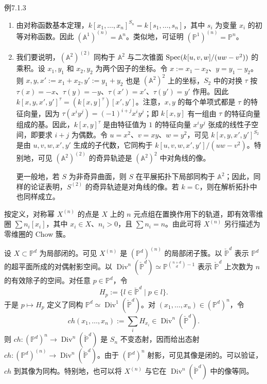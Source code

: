 \begin{origstatement}{例}{7.1.3}\label{ch07:7.1.3}
\begin{enumerate}[label=(\arabic*)]
\item 由对称函数基本定理，$k[x_1,\ldots,x_n]^{S_n}=k[s_1,\ldots,s_n]$，其中 $s_i$ 为变量 $x_i$ 的初等对称函数。因此 $(\mathbb A^1)^{(n)}=\mathbb A^n$。类似地，可证明 $(\mathbb P^1)^{(n)}=\mathbb P^n$。
\item 我们要说明，$(\mathbb A^2)^{(2)}$ 同构于 $\mathbb A^2$ 与二次锥面 $\operatorname{Spec}(k[u,v,w]/(uw-v^2))$ 的乘积。设 $x_1,y_1$ 和 $x_2,y_2$ 为两个因子的坐标。令 $x:=x_1-x_2$、$y=y_1-y_2$。则 $x,y,x':=x_1+x_2,y':=y_1+y_2$ 也是 $(\mathbb A^2)^2$ 上的坐标，$S_2$ 中的对换 $\tau$ 按 $\tau(x)=-x$、$\tau(y)=-y$、$\tau(x')=x'$、$\tau(y')=y'$ 作用。因此 $k[x,y,x',y']^\tau=(k[x,y]^\tau)[x',y']$。注意，$x,y$ 的每个单项式都是 $\tau$ 的特征向量，因为 $\tau(x^iy^j)=(-1)^{i+j}x^iy^j$；即 $k[x,y]$ 有一组由 $\tau$ 的特征向量组成的基。因此，$k[x,y]^\tau$ 是由特征值为 $1$ 的特征向量 $x^iy^j$ 张成的线性子空间，即要求 $i+j$ 为偶数。令 $u=x^2$、$v=xy$、$w=y^2$，可见 $k[x,y,x',y']^{S_2}$ 是由 $u,v,w,x',y'$ 生成的子代数，它同构于 $k[u,v,w,x',y']/(uw-v^2)$。特别地，可见 $(\mathbb A^2)^{(2)}$ 的奇异轨迹是 $(\mathbb A^2)^2$ 中对角线的像。

更一般地，若 $S$ 为非奇异曲面，则 $S$ 在平展拓扑下局部同构于 $\mathbb A^2$；因此，同样的论证表明，$S^{(2)}$ 的奇异轨迹是对角线的像。若 $k=\mathbb C$，则在解析拓扑中也同样成立。
\end{enumerate}
\end{origstatement}
按定义，对称幂 $X^{(n)}$ 的点是 $X$ 上的 $n$ 元点组在置换作用下的轨道，即有效零维圈 $\sum n_i[x_i]$，其中 $x_i\in X$、$n_i>0$，且 $\sum n_i=n$。由此可将 $X^{(n)}$ 另行描述为零维圈的 Chow 簇。

设 $X\subset\mathbb P^d$ 为局部闭的。可见 $X^{(n)}$ 是 $(\mathbb P^d)^{(n)}$ 的局部闭子簇。以 $\check{\mathbb P}^d$ 表示 $\mathbb P^d$ 的超平面所成的对偶射影空间。以 $\operatorname{Div}^n(\check{\mathbb P}^d)\simeq\mathbb P^{\binom{n+d}{d}-1}$ 表示 $\check{\mathbb P}^d$ 上次数为 $n$ 的有效除子的空间。对任意 $p\in\mathbb P^d$，令
\[
H_p:=\{l\in\check{\mathbb P}^d\mid p\in l\}.
\]
于是 $p\mapsto H_p$ 定义了同构 $\mathbb P^d\simeq\operatorname{Div}^1(\check{\mathbb P}^d)$。对 $(x_1,\ldots,x_n)\in(\mathbb P^d)^n$，令
\[
ch(x_1,\ldots,x_n):=\sum_i H_{x_i}\in\operatorname{Div}^n(\check{\mathbb P}^d).
\]
则 $ch:(\mathbb P^d)^n\to\operatorname{Div}^n(\check{\mathbb P}^d)$ 是 $S_n$ 不变态射，因而给出态射 $ch:(\mathbb P^d)^{(n)}\to\operatorname{Div}^n(\check{\mathbb P}^d)$。由于 $(\mathbb P^d)^n$ 射影，可见其像是闭的。可以验证，$ch$ 到其像为同构。特别地，也可以将 $X^{(n)}$ 与它在 $\operatorname{Div}^n(\check{\mathbb P}^d)$ 中的像等同。

